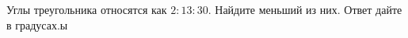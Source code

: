 \begin{ex}
	\begin{condition}
		Углы треугольника относятся как \(2:13:30\). Найдите меньший из них. Ответ дайте в градусах.ы
	\end{condition}
\end{ex}